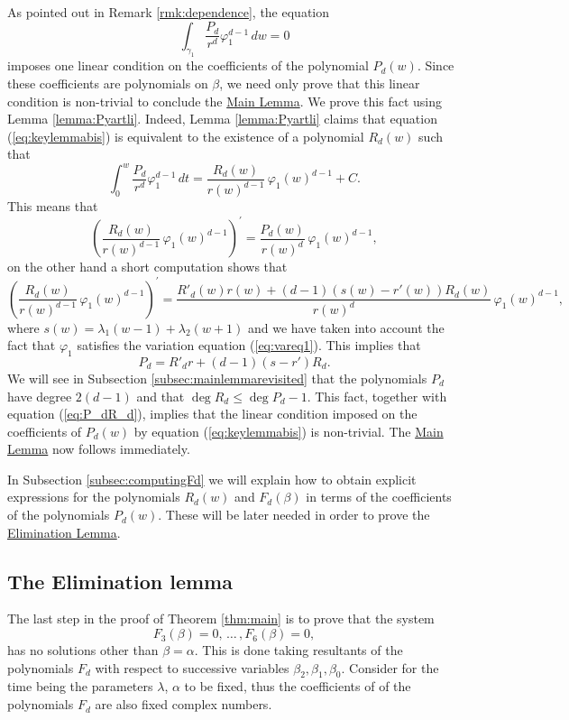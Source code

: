 As pointed out in Remark \ref{rmk:dependence}, the equation
\begin{equation}\label{eq:keylemmabis}
\int_{\gamma_1}\frac{P_d}{r^d}\varphi_1^{d-1}\,dw=0
\end{equation}
imposes one linear condition on the coefficients of the polynomial $P_d(w)$. Since these coefficients are polynomials on $\beta$, we need only prove that this linear condition is non-trivial to conclude the \hyperref[lemma:main]{Main Lemma}. We prove this fact using Lemma \ref{lemma:Pyartli}. Indeed, Lemma \ref{lemma:Pyartli} claims that equation (\ref{eq:keylemmabis}) is equivalent to the existence of a polynomial $R_d(w)$ such that
\[ \int_0^w \frac{P_d}{r^d}\varphi_1^{d-1}\,dt=\frac{R_d(w)}{r(w)^{d-1}}\,\varphi_1(w)^{d-1}+C. \]
This means that
\[ \left(\frac{R_d(w)}{r(w)^{d-1}}\,\varphi_1(w)^{d-1}\right)^{\prime}=\frac{P_d(w)}{r(w)^d}\,\varphi_1(w)^{d-1}, \]
on the other hand a short computation shows that 
\[ \left(\frac{R_d(w)}{r(w)^{d-1}}\,\varphi_1(w)^{d-1}\right)^{\prime}=\frac{R'_d(w)r(w)+(d-1)(s(w)-r'(w))R_d(w)}{r(w)^{d}}\,\varphi_1(w)^{d-1}, \]
where $s(w)=\lambda_1(w-1)+\lambda_2(w+1)$ and we have taken into account the fact that $\varphi_1$ satisfies the variation equation (\ref{eq:vareq1}). This implies that
\begin{equation}\label{eq:P_dR_d}
 P_d=R'_dr+(d-1)(s-r')R_d. 
\end{equation}
We will see in Subsection \ref{subsec:mainlemmarevisited} that the polynomials $P_d$ have degree $2(d-1)$ and that $
\deg{R_d}\leq\deg{P_d}-1$. This fact, together with equation (\ref{eq:P_dR_d}), implies that the linear condition imposed on the coefficients of $P_d(w)$ by equation (\ref{eq:keylemmabis}) is non-trivial. The \hyperref[lemma:main]{Main Lemma} now follows immediately.

\begin{remark}
In Subsection \ref{subsec:computingFd} we will explain how to obtain explicit expressions for the polynomials $R_d(w)$ and $F_d(\beta)$ in terms of the coefficients of the polynomials $P_d(w)$. These will be later needed in order to prove the \hyperref[lemma:elimination]{Elimination Lemma}.
\end{remark}


\subsection{The Elimination lemma}\label{subsec:eliminationlemma}


The last step in the proof of Theorem \ref{thm:main} is to prove that the system
\[F_3(\beta)=0,\,\ldots\, ,F_6(\beta)=0, \]
has no solutions other than $\beta=\alpha$. This is done taking resultants of the polynomials $F_d$ with respect to successive variables $\beta_2,\beta_1,\beta_0$. Consider for the time being the parameters $\lambda$, $\alpha$ to be fixed, thus the coefficients of of the polynomials $F_d$ are also fixed complex numbers. 

